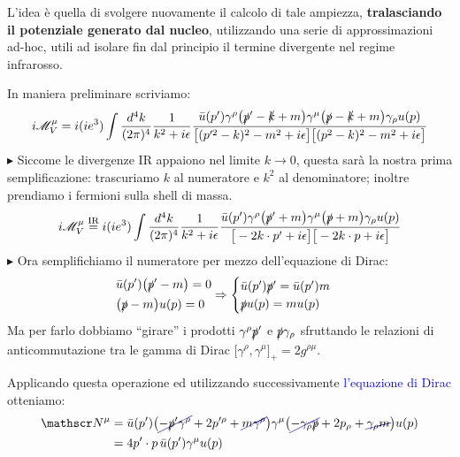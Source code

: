 \documentclass[../main.tex]{subfiles}
\begin{document}
L'idea è quella di svolgere nuovamente il calcolo di tale ampiezza, \textbf{tralasciando il potenziale generato dal nucleo}, utilizzando una serie di approssimazioni ad-hoc, utili ad isolare fin dal principio il termine divergente nel regime infrarosso.

In maniera preliminare scriviamo:
\begin{align*}
    i\mathscr M^\mu_V = i(ie^3)\int\frac{d^4k}{(2\pi)^4}\frac{1}{k^2+i\epsilon}\frac{\bar u(p')\gamma^\rho\big(\slashed p'-\slashed k + m\big)\gamma^\mu\big(\slashed p-\slashed k + m\big)\gamma_\rho u(p)}{\big[(p'^2-k)^2 -m^2 + i\epsilon\big]\big[(p^2-k)^2 -m^2 + i\epsilon\big]}
\end{align*}
$\blacktriangleright$ Siccome le divergenze IR appaiono nel limite \(\boxed{k\rightarrow0}\), questa sarà la nostra prima semplificazione: trascuriamo \(k\) al numeratore e \(k^2\) al denominatore; inoltre prendiamo i fermioni sulla shell di massa.
\begin{align*}
    i\mathscr M^\mu_V \overset{\text{IR}}{=} i(ie^3)\int\frac{d^4k}{(2\pi)^4}\frac{1}{k^2+i\epsilon}\frac{\bar u(p')\gamma^\rho\big(\slashed p' + m\big)\gamma^\mu\big(\slashed p+ m\big)\gamma_\rho u(p)}{\big[-2k\cdot p' + i\epsilon\big]\big[-2k\cdot p + i\epsilon\big]}
\end{align*}
$\blacktriangleright$ Ora semplifichiamo il numeratore per mezzo dell'equazione di Dirac:
\[
\begin{aligned}
    &\bar u(p') \big(\slashed p' - m\big) = 0  \\
    &\big(\slashed p - m\big)u(p) = 0
\end{aligned}
\Rightarrow
\begin{cases}
    \bar u(p') \slashed p' = \bar u(p')m \\
    \slashed p u(p)  =  m u(p)
\end{cases}
\]
Ma per farlo dobbiamo “girare” i prodotti \(\gamma^\rho \slashed p'\) e \(\slashed p\gamma_\rho\) sfruttando le relazioni di anticommutazione tra le gamma di Dirac \(\big[\gamma^\rho, \gamma^\mu\big]_+ = 2g^{\rho\mu}\).

Applicando questa operazione ed utilizzando successivamente \textcolor{blue}{l'equazione di Dirac} otteniamo:
\begin{align*}
    \mathscr N^\mu &= \bar u(p')\big(\Ccancel[blue]{-\slashed p'\gamma^\rho} + 2p'^\rho + \Ccancel[blue]{m\gamma^\rho}\big)\gamma^\mu\big(\Ccancel[blue]{-\gamma_\rho\slashed p} + 2p_\rho+ \Ccancel[blue]{\gamma_\rho m}\big) u(p)\\
    &=4p'\cdot p\,\bar u(p')\gamma^\mu u(p)
\end{align*}
\end{document}
